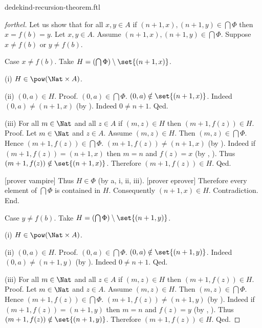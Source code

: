 \documentclass{naproche-library}
\begin{document}
\begin{smodule}[title=Dedekind's Recursion Theorem]{dedekind-recursion-theorem.ftl}
\begin{proof}[forthel]
      Let us show that for all $x, y \in A$ if $(n + 1, x),
      (n + 1, y) \in \bigcap \Phi$ then $x = f(b) = y$.
        Let $x, y \in A$.
        Assume $(n + 1, x), (n + 1, y) \in \bigcap \Phi$.
        Suppose $x \neq f(b)$ or $y \neq f(b)$.

        Case $x \neq f(b)$.
          Take $H = (\bigcap \Phi) \setminus \set{(n + 1,x)}$.

          (i) $H \in \pow(\Nat \times A)$.

          (ii) $(0,a) \in H$. \newline
          Proof.
            $(0,a) \in \bigcap \Phi$.
            $(0,a) \notin \set{(n + 1,x)}$.
            Indeed $(0,a) \neq (n + 1,x)$ (by ).
            Indeed $0 \neq n + 1$.
          Qed.

          (iii) For all $m \in \Nat$ and all $z \in A$ if $(m,z) \in H$ then $(m + 1,f(z)) \in H$. \newline
          Proof.
            Let $m \in \Nat$ and $z \in A$.
            Assume $(m,z) \in H$.
            Then $(m,z) \in \bigcap \Phi$.
            Hence $(m + 1,f(z)) \in \bigcap \Phi$.
            $(m + 1,f(z)) \neq (n + 1,x)$ (by ).
            Indeed if $(m + 1,f(z)) = (n + 1,x)$ then $m = n$ and $f(z) = x$ (by , ).
            Thus $(m + 1,f(z)) \notin \set{(n + 1,x)}$.
            Therefore $(m + 1,f(z)) \in H$.
          Qed.

          [prover vampire]
          Thus $H \in \Phi$ (by a, i, ii, iii).
          [prover eprover]
          Therefore every element of $\bigcap \Phi$ is contained in $H$.
          Consequently $(n + 1,x) \in H$.
          Contradiction.
        End.

        Case $y \neq f(b)$.
          Take $H = (\bigcap \Phi) \setminus \set{(n + 1,y)}$.

          (i) $H \in \pow(\Nat \times A)$.

          (ii) $(0,a) \in H$. \newline
          Proof.
            $(0,a) \in \bigcap \Phi$.
            $(0,a) \notin \set{(n + 1,y)}$.
            Indeed $(0,a) \neq (n + 1,y)$ (by ).
            Indeed $0 \neq n + 1$.
          Qed.

          (iii) For all $m \in \Nat$ and all $z \in A$ if $(m,z) \in H$ then $(m + 1,f(z)) \in H$. \newline
          Proof.
            Let $m \in \Nat$ and $z \in A$.
            Assume $(m,z) \in H$.
            Then $(m,z) \in \bigcap \Phi$.
            Hence $(m + 1,f(z)) \in \bigcap \Phi$.
            $(m + 1,f(z)) \neq (n + 1,y)$ (by ).
            Indeed if $(m + 1,f(z)) = (n + 1,y)$ then $m = n$ and $f(z) = y$ (by , ).
            Thus $(m + 1,f(z)) \notin \set{(n + 1,y)}$.
            Therefore $(m + 1,f(z)) \in H$.
          Qed.


\end{proof}
\end{smodule}
\end{document}
